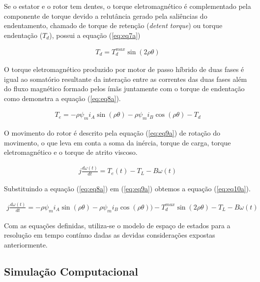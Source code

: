 Se o estator e o rotor tem dentes, o torque eletromagnético é complementado pela componente de torque devido a relutância gerado pela saliências do endentamento, chamado de torque de retenção (\textit{detent torque}) ou torque endentação ($T_d$), possui a equação (\ref{eq:eq7a})

\begin{eqnarray}
\label{eq:eq7a}
T_d = T_{d}^{max}\sin(2 \rho \theta)
\end{eqnarray}

O torque eletromagnético produzido por motor de passo híbrido de duas fases é igual ao somatório resultante da interação entre as correntes das duas fases além do fluxo magnético formado pelos ímãs juntamente com o torque de endentação como demonstra a equação (\ref{eq:eq8a}).

\begin{eqnarray}
	\label{eq:eq8a}
	T_e = - \rho \psi_m i_A \sin(\rho \theta) - \rho \psi_m i_B \cos(\rho \theta ) - T_d
\end{eqnarray}

O movimento do rotor é descrito pela equação (\ref{eq:eq9a}) de rotação do movimento, o que leva em conta a soma da inércia, torque de carga, torque eletromagnético e o torque de atrito viscoso.

\begin{eqnarray}
\label{eq:eq9a}
j\frac{d\omega(t)}{dt} = T_e(t) - T_L - B\omega(t)
\end{eqnarray}

Substituindo a equação (\ref{eq:eq8a}) em (\ref{eq:eq9a}) obtemos a equação (\ref{eq:eq10a}).

\scriptsize

\begin{eqnarray}
\label{eq:eq10a}
j\frac{d\omega(t)}{dt} = - \rho \psi_m i_A \sin(\rho \theta) - \rho \psi_m i_B \cos(\rho \theta ) )- T_{d}^{max}\sin(2 \rho \theta)  - T_L - B\omega(t)
\end{eqnarray}

\normalsize

Com as equações definidas, utiliza-se o modelo de espaço de estados para a resolução em tempo contínuo dadas as devidas considerações expostas anteriormente. 



\subsection{Simulação Computacional}


